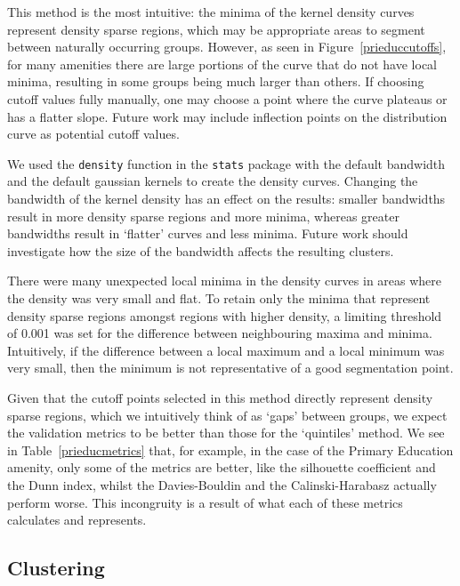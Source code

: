 \documentclass[11pt, a4paper]{article}
\begin{document}
This method is the most intuitive: the minima of the kernel density curves represent density sparse regions, which may be appropriate areas to segment between naturally occurring groups. However, as seen in Figure~\ref{prieduccutoffs}, for many amenities there  are large  portions of the  curve  that do not have local minima, resulting in some groups being much larger than others. If choosing cutoff values fully manually, one may choose a point where the curve plateaus or has a flatter slope. Future work may include inflection points on the distribution curve as potential cutoff values.
\par
We used the \texttt{density} function in the \texttt{stats} package with the default bandwidth and the default gaussian kernels to create the density curves. Changing the bandwidth of the kernel density has an effect on the results: smaller bandwidths result in more density sparse regions and more minima, whereas greater bandwidths result in `flatter' curves and less minima. Future work should investigate how the size of the bandwidth affects the resulting clusters.
\par
There were many unexpected local minima in the density curves in areas where the density was very small and flat. To retain only the minima that represent density sparse regions amongst regions with higher density, a limiting threshold of 0.001 was set for the difference between neighbouring maxima and minima. Intuitively, if the difference between a local maximum and a local minimum was very small, then the minimum is not representative of a good segmentation point.
\par
Given that the cutoff points selected in this method directly represent density sparse regions, which we intuitively think of as `gaps' between groups, we expect the validation metrics to be better than those for the `quintiles' method. We see in Table~\ref{prieducmetrics} that, for example, in the case of the Primary Education amenity, only some of the metrics are better, like the silhouette coefficient and the Dunn index, whilst the Davies-Bouldin and the Calinski-Harabasz actually perform worse. This incongruity is a result of what each of these metrics calculates and represents.







\subsection{Clustering}
\end{document}
